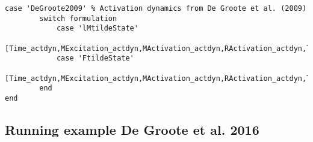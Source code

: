 \documentclass[a4paper,oneside,11pt]{article}
\begin{document}
\begin{lstlisting}[frame=none,basicstyle=\tiny]
    case 'DeGroote2009' % Activation dynamics from De Groote et al. (2009) 
        switch formulation
            case 'lMtildeState'
                [Time_actdyn,MExcitation_actdyn,MActivation_actdyn,RActivation_actdyn,TForcetilde_actdyn,TForce_actdyn,lMtilde_actdyn,lM_actdyn,MuscleNames_actdyn,OptInfo_actdyn,DatStore_actdyn]=SolveMuscleRedundancy_lMtildeState_actdyn(model_path,IK_path,ID_path,time,OutPath,Misc);
            case 'FtildeState'   
                [Time_actdyn,MExcitation_actdyn,MActivation_actdyn,RActivation_actdyn,TForcetilde_actdyn,TForce_actdyn,lMtilde_actdyn,lM_actdyn,MuscleNames_actdyn,OptInfo_actdyn,DatStore_actdyn]=SolveMuscleRedundancy_FtildeState_actdyn(model_path,IK_path,ID_path,time,OutPath,Misc);
        end
end
\end{lstlisting}

\subsection{Running example De Groote et al. 2016}
\end{document}
